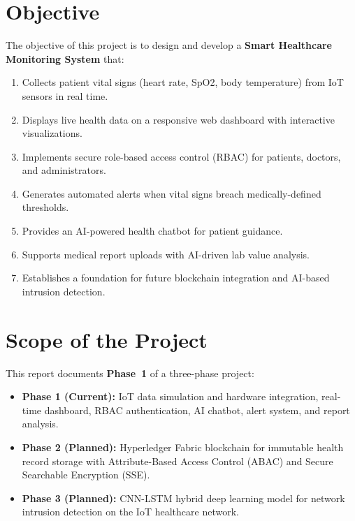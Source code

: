 \section{Objective}
The objective of this project is to design and develop a \textbf{Smart Healthcare Monitoring System} that:
\begin{enumerate}[leftmargin=*]
    \item Collects patient vital signs (heart rate, SpO2, body temperature) from IoT sensors in real time.
    \item Displays live health data on a responsive web dashboard with interactive visualizations.
    \item Implements secure role-based access control (RBAC) for patients, doctors, and administrators.
    \item Generates automated alerts when vital signs breach medically-defined thresholds.
    \item Provides an AI-powered health chatbot for patient guidance.
    \item Supports medical report uploads with AI-driven lab value analysis.
    \item Establishes a foundation for future blockchain integration and AI-based intrusion detection.
\end{enumerate}

\section{Scope of the Project}
This report documents \textbf{Phase~1} of a three-phase project:
\begin{itemize}[leftmargin=*]
    \item \textbf{Phase 1 (Current):} IoT data simulation and hardware integration, real-time dashboard, RBAC authentication, AI chatbot, alert system, and report analysis.
    \item \textbf{Phase 2 (Planned):} Hyperledger Fabric blockchain for immutable health record storage with Attribute-Based Access Control (ABAC) and Secure Searchable Encryption (SSE).
    \item \textbf{Phase 3 (Planned):} CNN-LSTM hybrid deep learning model for network intrusion detection on the IoT healthcare network.
\end{itemize}

